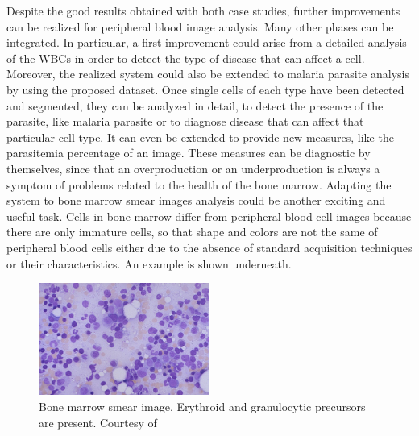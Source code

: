 \documentclass[final,a4paper,12pt,english]{UnicaPhdThesis3}
\begin{document}
{Despite the good results obtained with both case studies, further improvements can be realized for peripheral blood image analysis. Many other phases can be integrated. 
In particular, a first improvement could arise from a detailed analysis of the WBCs in order to detect the type of disease that can affect a cell. 
Moreover, the realized system could also be extended to malaria parasite analysis by using the proposed dataset. Once single cells of each type have been detected and segmented, they can be analyzed in detail, to detect the presence of the parasite, like malaria parasite or to diagnose disease that can affect that particular cell type.   
It can even be extended to provide new measures, like the parasitemia percentage of an image.
These measures can be diagnostic by themselves, since that an overproduction or an underproduction is always a symptom of problems related to the health of the bone marrow. Adapting the system to bone marrow smear images analysis could be another exciting and useful task. Cells in bone marrow differ from peripheral blood cell images because there are only immature cells, so that shape and colors are not the same of peripheral blood cells either due to the absence of standard acquisition techniques or their characteristics. An example is shown underneath.

\begin{figure}[h]
	\centering
	\includegraphics[width=0.5\textwidth]{images/bone_marrow}
	\caption{\label{fig:bone_marrow} Bone marrow smear image. Erythroid and granulocytic precursors are present. Courtesy of \cite{Med_Utah}}
\end{figure}



 


\appendix
}
\end{document}
